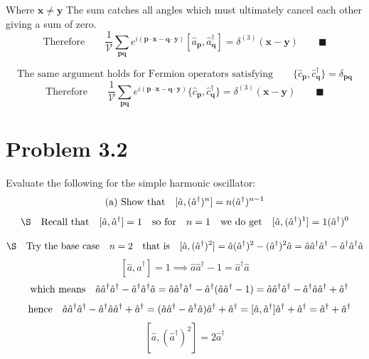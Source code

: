 \documentclass{amsart}
\begin{document}
Where $\boldsymbol{x}\ne \boldsymbol{y}$ The sum catches all angles which must ultimately cancel each other giving a sum of zero.
\[\text{Therefore}\qquad\frac{1}{\mathcal{V}}\sum_{\boldsymbol{pq}}e^{i(\boldsymbol{p\cdot x}-\boldsymbol{q\cdot y})}[\hat{a}_{\boldsymbol{p}},\hat{a}^\dagger_{\boldsymbol{q}}]=\delta^{(3)} (\boldsymbol{x}-\boldsymbol{y})\qquad\blacksquare\]

\[\text{The same argument holds for Fermion operators satisfying}\qquad\{\hat{c}_{\boldsymbol{p}},\hat{c}^\dagger_{\boldsymbol{q}}\}  = \delta_{\boldsymbol{pq}}  \]
\[\text{Therefore}\qquad\frac{1}{\mathcal{V}}\sum_{\boldsymbol{pq}}e^{i(\boldsymbol{p\cdot x}-\boldsymbol{q\cdot y})}\{\hat{c}_{\boldsymbol{p}},\hat{c}^\dagger_{\boldsymbol{q}}\}=\delta^{(3)} (\boldsymbol{x}-\boldsymbol{y})\qquad\blacksquare\]

\section*{Problem 3.2}
Evaluate the following for the simple harmonic oscillator:
\[\qq*{(a) Show that}[\hat{a},(\hat{a}^\dagger)^n]= n(\hat{a}^\dagger)^{n-1}  \]
\[\S\qq{Recall that}[\hat{a},\hat{a}^\dagger] = 1\qq{so for}n=1\qq{we do get}[\hat{a},(\hat{a}^\dagger)^1] =1(\hat{a}^\dagger)^0 \]

\[\S\qq{Try the base case} n=2\qq{that is}[\hat{a},(\hat{a}^\dagger)^2] = \hat{a}(\hat{a}^\dagger)^2-(\hat{a}^\dagger)^2 \hat{a} = \hat{a}\hat{a}^\dagger \hat{a}^\dagger-\hat{a}^\dagger \hat{a}^\dagger \hat{a}   \]
\[[\hat{a},\hat{a}^\dagger] = 1 \implies \hat{a}\hat{a}^\dagger -1 =  \hat{a}^\dagger \hat{a}\]
\[\qq{which means}\hat{a}\hat{a}^\dagger \hat{a}^\dagger-\hat{a}^\dagger \hat{a}^\dagger \hat{a} =\hat{a}\hat{a}^\dagger \hat{a}^\dagger-\hat{a}^\dagger (\hat{a}\hat{a}^\dagger -1 ) =\hat{a}\hat{a}^\dagger \hat{a}^\dagger-\hat{a}^\dagger \hat{a}\hat{a}^\dagger +\hat{a}^\dagger\]
\[\qq{hence}\hat{a}\hat{a}^\dagger \hat{a}^\dagger-\hat{a}^\dagger \hat{a}\hat{a}^\dagger +\hat{a}^\dagger=(\hat{a}\hat{a}^\dagger -\hat{a}^\dagger \hat{a})\hat{a}^\dagger +\hat{a}^\dagger   =[\hat{a},\hat{a}^\dagger] \hat{a}^\dagger +\hat{a}^\dagger  = \hat{a}^\dagger +\hat{a}^\dagger \]
\[ [\hat{a},(\hat{a}^\dagger)^2]   =2\hat{a}^\dagger \]
\end{document}
